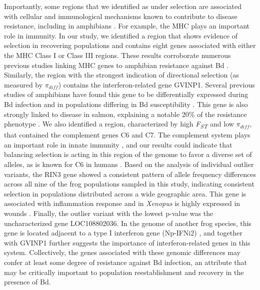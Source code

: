 \documentclass[9pt,twocolumn,twoside,lineno]{pnas-new}
\begin{document}
Importantly, some regions that we identified as under selection are
associated with cellular and immunological mechanisms known to
contribute to disease resistance, including in amphibians
\citep{zamudio2020}. For example, the MHC plays an important role in
immunity. In our study, we identified a region that shows evidence of
selection in recovering populations and contains eight genes associated
with either the MHC Class I or Class III regions. These results
corroborate numerous previous studies linking MHC genes to amphibian
resistance against Bd \citep[e.g.,][]{savage2011, bataille2015}.
Similarly, the region with the strongest indication of directional
selection (as measured by \(\pi_{diff}\)) contains the
interferon-related gene GVINP1. Several previous studies of amphibians
have found this gene to be differentially expressed during Bd infection
\citep[e.g.,][]{grogan2018b, ellison2014} and in populations differing
in Bd susceptibility \citep{grogan2018b}. This gene is also strongly
linked to disease in salmon, explaining a notable 20\% of the resistance
phenotype \citep{robledo2020, robledo2018}. We also identified a region,
characterized by high \emph{F\textsubscript{ST}} and low \(\pi_{diff}\),
that contained the complement genes C6 and C7. The complement system
plays an important role in innate immunity \citep{rieraromo2016}, and
our results could indicate that balancing selection is acting in this
region of the genome to favor a diverse set of alleles, as is known for
C6 in humans \citep{soejima2005}. Based on the analysis of individual
outlier variants, the RIN3 gene showed a consistent pattern of allele
frequency differences across all nine of the frog populations sampled in
this study, indicating consistent selection in populations distributed
across a wide geographic area. This gene is associated with inflammation
response and in \emph{Xenopus} is highly expressed in wounds
\citep{fukazawa2009}. Finally, the outlier variant with the lowest
p-value was the uncharacterized gene LOC108802036. In the genome of
another frog species, this gene is located adjacent to a type I
interferon gene (Np-IFNi2) \citep{gan2018}, and together with GVINP1
further suggests the importance of interferon-related genes in this
system. Collectively, the genes associated with these genomic
differences may confer at least some degree of resistance against Bd
infection, an attribute that may be critically important to population
reestablishment and recovery in the presence of Bd.
\end{document}

